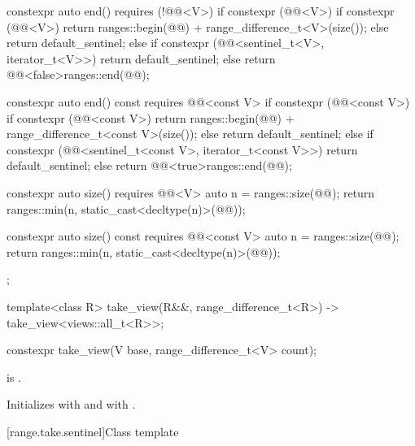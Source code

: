 \begin{codeblock}
{{    constexpr auto end() requires (!@@<V>) {
      if constexpr (@@<V>) {
        if constexpr (@@<V>)
          return ranges::begin(@@) + range_difference_t<V>(size());
        else
          return default_sentinel;
      } else if constexpr (@@<sentinel_t<V>, iterator_t<V>>) {
        return default_sentinel;
      } else {
        return @@<false>{ranges::end(@@)};
      }
    }

    constexpr auto end() const requires @@<const V> {
      if constexpr (@@<const V>) {
        if constexpr (@@<const V>)
          return ranges::begin(@@) + range_difference_t<const V>(size());
        else
          return default_sentinel;
      } else if constexpr (@@<sentinel_t<const V>, iterator_t<const V>>) {
        return default_sentinel;
      } else {
        return @@<true>{ranges::end(@@)};
      }
    }

    constexpr auto size() requires @@<V> {
      auto n = ranges::size(@@);
      return ranges::min(n, static_cast<decltype(n)>(@@));
    }

    constexpr auto size() const requires @@<const V> {
      auto n = ranges::size(@@);
      return ranges::min(n, static_cast<decltype(n)>(@@));
    }
  };

  template<class R>
    take_view(R&&, range_difference_t<R>)
      -> take_view<views::all_t<R>>;
}
\end{codeblock}

%
\begin{itemdecl}
constexpr take_view(V base, range_difference_t<V> count);
\end{itemdecl}

\begin{itemdescr}
\pnum
\expects
{} is .

\pnum
\effects
Initializes  with  and
 with .
\end{itemdescr}

[range.take.sentinel]{Class template }

